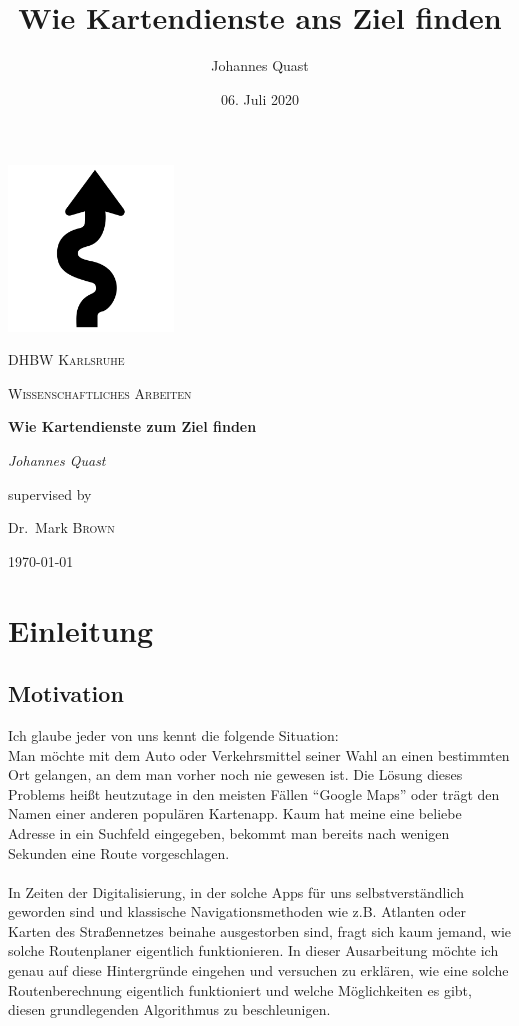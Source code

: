 \documentclass[11pt]{scrreprt}
\title{Wie Kartendienste ans Ziel finden}
\date{06. Juli 2020}
\author{Johannes Quast}
\begin{document}
\begin{titlepage}
	\centering
	\includegraphics[width=0.33\textwidth]{Bilder/Arrow}\par\vspace{1cm}
	{\scshape\LARGE DHBW Karlsruhe \par}
	\vspace{1cm}
	{\scshape\Large Wissenschaftliches Arbeiten\par}
	\vspace{1.5cm}
	{\huge\bfseries Wie Kartendienste zum Ziel finden\par}
	\vspace{2cm}
	{\Large\itshape Johannes Quast\par}
	\vfill
	supervised by\par
	Dr.~Mark \textsc{Brown}
	
	\vfill
	
	{\large \today\par}
\end{titlepage}

\tableofcontents

\chapter{Einleitung}
	\section{Motivation}
	Ich glaube jeder von uns kennt die folgende Situation: \\
	Man möchte mit dem Auto oder Verkehrsmittel seiner Wahl an einen bestimmten Ort gelangen, an dem man vorher noch nie gewesen ist.
	Die Lösung dieses Problems heißt heutzutage in den meisten Fällen \enquote{Google Maps} oder trägt den Namen einer anderen populären Kartenapp.
	Kaum hat meine eine beliebe Adresse in ein Suchfeld eingegeben, bekommt man bereits nach wenigen Sekunden eine Route vorgeschlagen.
	\\\\
	In Zeiten der Digitalisierung, in der solche Apps für uns selbstverständlich geworden sind und klassische Navigationsmethoden wie z.B. Atlanten oder Karten des Straßennetzes beinahe ausgestorben sind, fragt sich kaum jemand, wie solche Routenplaner eigentlich funktionieren.
	In dieser Ausarbeitung möchte ich genau auf diese Hintergründe eingehen und versuchen zu erklären, wie eine solche Routenberechnung eigentlich funktioniert und welche Möglichkeiten es gibt, diesen grundlegenden Algorithmus zu beschleunigen.
\end{document}
